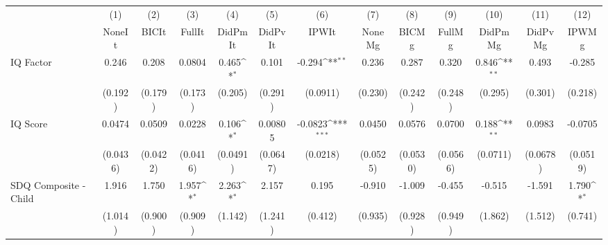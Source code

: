{
\def\sym#1{\ifmmode^{#1}\else\(^{#1}\)\fi}
\begin{tabular}{l*{12}{c}}
\toprule
            &\multicolumn{1}{c}{(1)}&\multicolumn{1}{c}{(2)}&\multicolumn{1}{c}{(3)}&\multicolumn{1}{c}{(4)}&\multicolumn{1}{c}{(5)}&\multicolumn{1}{c}{(6)}&\multicolumn{1}{c}{(7)}&\multicolumn{1}{c}{(8)}&\multicolumn{1}{c}{(9)}&\multicolumn{1}{c}{(10)}&\multicolumn{1}{c}{(11)}&\multicolumn{1}{c}{(12)}\\
            &\multicolumn{1}{c}{NoneIt}&\multicolumn{1}{c}{BICIt}&\multicolumn{1}{c}{FullIt}&\multicolumn{1}{c}{DidPmIt}&\multicolumn{1}{c}{DidPvIt}&\multicolumn{1}{c}{IPWIt}&\multicolumn{1}{c}{NoneMg}&\multicolumn{1}{c}{BICMg}&\multicolumn{1}{c}{FullMg}&\multicolumn{1}{c}{DidPmMg}&\multicolumn{1}{c}{DidPvMg}&\multicolumn{1}{c}{IPWMg}\\
\midrule
IQ Factor   &       0.246         &       0.208         &      0.0804         &       0.465\sym{*}  &       0.101         &      -0.294\sym{**} &       0.236         &       0.287         &       0.320         &       0.846\sym{**} &       0.493         &      -0.285         \\
            &     (0.192)         &     (0.179)         &     (0.173)         &     (0.205)         &     (0.291)         &    (0.0911)         &     (0.230)         &     (0.242)         &     (0.248)         &     (0.295)         &     (0.301)         &     (0.218)         \\
\addlinespace
IQ Score    &      0.0474         &      0.0509         &      0.0228         &       0.106\sym{*}  &     0.00805         &     -0.0823\sym{***}&      0.0450         &      0.0576         &      0.0700         &       0.188\sym{**} &      0.0983         &     -0.0705         \\
            &    (0.0436)         &    (0.0422)         &    (0.0416)         &    (0.0491)         &    (0.0647)         &    (0.0218)         &    (0.0525)         &    (0.0530)         &    (0.0566)         &    (0.0711)         &    (0.0678)         &    (0.0519)         \\
\addlinespace
SDQ Composite - Child&       1.916         &       1.750         &       1.957\sym{*}  &       2.263\sym{*}  &       2.157         &       0.195         &      -0.910         &      -1.009         &      -0.455         &      -0.515         &      -1.591         &       1.790\sym{*}  \\
            &     (1.014)         &     (0.900)         &     (0.909)         &     (1.142)         &     (1.241)         &     (0.412)         &     (0.935)         &     (0.928)         &     (0.949)         &     (1.862)         &     (1.512)         &     (0.741)         \\

\end{tabular}}
